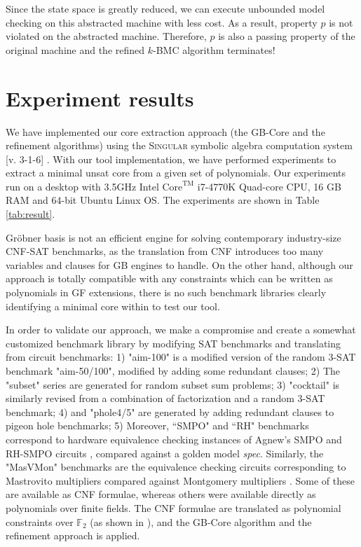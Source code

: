 \begin{Example}
Since the state space is greatly
reduced, we can execute unbounded model checking on this  abstracted
machine with less cost. As a result, property $p$ is not violated on
the abstracted machine. Therefore, $p$ is also a passing property of
the original machine and  the refined $k$-BMC algorithm terminates!


\end{Example}

\section{Experiment results}
\label{sec:exp}


We have implemented our core extraction approach (the GB-Core
and the refinement algorithms) using the \textsc{Singular} symbolic
algebra computation system [v. 3-1-6] \cite{DGPS}. With our
tool implementation, we have performed experiments to extract a
minimal unsat core from a given set of  
polynomials. Our experiments run on a desktop with
3.5GHz Intel $\text{Core}^\text{TM}$ i7-4770K Quad-core CPU, 16 GB RAM and
64-bit Ubuntu Linux OS. The experiments are shown in Table \ref{tab:result}. 

Gr\"obner basis is not an efficient engine for solving contemporary
industry-size CNF-SAT benchmarks, as the translation from CNF introduces
too many variables and clauses for GB engines to handle. 
On the other hand, although our approach is totally compatible with 
any constraints which can be written as polynomials in GF extensions,
there is no such benchmark libraries clearly identifying a minimal core within 
to test our tool.

In order to
validate our approach, we make a compromise and create a somewhat customized  benchmark
library by modifying SAT benchmarks and translating from circuit benchmarks: 
1) "aim-100" is a modified version  of the random 3-SAT
benchmark "aim-50/100", modified by adding some redundant clauses; 2)
The "subset" series are generated for random subset sum problems; 3)
"cocktail" is similarly revised from a combination of factorization
and a random 3-SAT benchmark; 4) and "phole4/5" are generated by
adding redundant clauses to pigeon hole benchmarks; 5) Moreover,
``SMPO" and ``RH" benchmarks correspond to hardware equivalence checking
instances of Agnew's SMPO and RH-SMPO
circuits \cite{agnew1991implementation,RHmulti}, compared against a golden model
{\it spec}. Similarly, the "MasVMon" benchmarks are the equivalence
checking  circuits corresponding to Mastrovito multipliers compared
against  Montgomery multipliers \cite{lv:tcad2013}. Some of these are
available as CNF formulae, whereas others were available directly as
polynomials over finite fields. The CNF formulae are translated as
polynomial constraints over $\mathbb{F}_2$ (as shown in
\cite{condrat-tacas07}), and the GB-Core algorithm and the refinement
approach is applied.   

